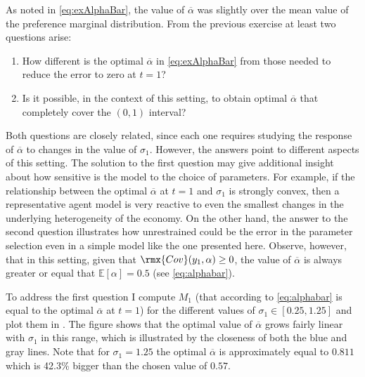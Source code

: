 \documentclass[english, a4paper, 12pt]{article}
\begin{document}
\newpage
As noted in \eqref{eq:exAlphaBar}, the value of $\overline{\alpha}$ was slightly over the mean value of the preference marginal distribution. From the previous exercise at least two questions arise:
	\begin{enumerate}
		\item How different is the optimal $\overline{\alpha}$ in \eqref{eq:exAlphaBar} from those needed to reduce the error to zero at $t = 1$?
		\item Is it possible, in the context of this setting, to obtain optimal $\overline{\alpha}$ that completely cover the $(0,1)$ interval?  
	\end{enumerate}
Both questions are closely related, since each one requires studying the response of $\overline{\alpha}$ to changes in the value of $\sigma_{1}$. However, the answers point to different aspects of this setting. The solution to the first question may give additional insight about how sensitive is the model to the choice of parameters. For example, if the relationship between the optimal $\overline{\alpha}$ at $t = 1$ and $\sigma_{1}$ is strongly convex, then a representative agent model is very reactive to even the smallest changes in the underlying heterogeneity of the economy. On the other hand, the answer to the second question illustrates how unrestrained could be the error in the parameter selection even in a simple model like the one presented here. Observe, however, that in this setting, given that $\rmx{Cov}(y_{1},\alpha) \geq 0$, the value of $\overline{\alpha}$ is always greater or equal that $\mathbb{E}[\alpha] = 0.5$ (see \eqref{eq:alphabar}).

To address the first question I compute $M_{1}$ (that according to \eqref{eq:alphabar} is equal to the optimal $\overline{\alpha}$ at $t = 1$) for the different values of $\sigma_{1} \in [0.25, 1.25]$ and plot them in . The figure shows that the optimal value of $\overline{\alpha}$ grows fairly linear with $\sigma_{1}$ in this range, which is illustrated by the closeness of both the blue and gray lines. Note that for $\sigma_{1} = 1.25$ the optimal $\overline{\alpha}$ is approximately equal to $0.811$ which is 42.3\% bigger than the chosen value of $0.57$.
\end{document}
